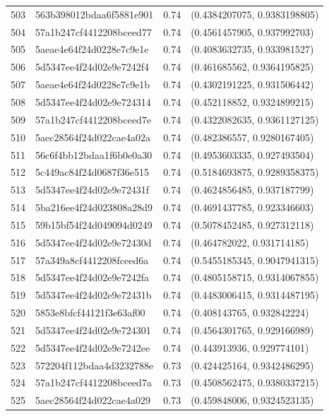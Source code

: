 \begin{table}[ht]
\begin{tabular}{rlrl}
  503 & 563b398012bdaa6f5881e901 & 0.74 & (0.4384207075, 0.9383198805) \\ 
  504 & 57a1b247cf4412208bceed77 & 0.74 & (0.4561457905, 0.937992703) \\ 
  505 & 5aeae4e64f24d0228e7c9e1e & 0.74 & (0.4083632735, 0.933981527) \\ 
  506 & 5d5347ee4f24d02e9e7242f4 & 0.74 & (0.461685562, 0.9364195825) \\ 
  507 & 5aeae4e64f24d0228e7c9e1b & 0.74 & (0.4302191225, 0.931506442) \\ 
  508 & 5d5347ee4f24d02e9e724314 & 0.74 & (0.452118852, 0.9324899215) \\ 
  509 & 57a1b247cf4412208bceed7e & 0.74 & (0.4322082635, 0.9361127125) \\ 
  510 & 5aec28564f24d022cae4a02a & 0.74 & (0.482386557, 0.9280167405) \\ 
  511 & 56c6f4bb12bdaa1f6b0e0a30 & 0.74 & (0.4953603335, 0.927493504) \\ 
  512 & 5c449ac84f24d0687f36e515 & 0.74 & (0.5184693875, 0.9289358375) \\ 
  513 & 5d5347ee4f24d02e9e72431f & 0.74 & (0.4624856485, 0.937187799) \\ 
  514 & 5ba216ee4f24d023808a28d9 & 0.74 & (0.4691437785, 0.923346603) \\ 
  515 & 59b15bf54f24d049094d0249 & 0.74 & (0.5078452485, 0.927312118) \\ 
  516 & 5d5347ee4f24d02e9e72430d & 0.74 & (0.464782022, 0.931714185) \\ 
  517 & 57a349a8cf4412208fceed6a & 0.74 & (0.5455185345, 0.9047941315) \\ 
  518 & 5d5347ee4f24d02e9e7242fa & 0.74 & (0.4805158715, 0.9314067855) \\ 
  519 & 5d5347ee4f24d02e9e72431b & 0.74 & (0.4483006415, 0.9314487195) \\ 
  520 & 5853e8bfcf44121f3e63af00 & 0.74 & (0.408143765, 0.932842224) \\ 
  521 & 5d5347ee4f24d02e9e724301 & 0.74 & (0.4564301765, 0.929166989) \\ 
  522 & 5d5347ee4f24d02e9e7242ee & 0.74 & (0.443913936, 0.929774101) \\ 
  523 & 572204f112bdaa4d3232788e & 0.73 & (0.424425164, 0.9342486295) \\ 
  524 & 57a1b247cf4412208bceed7a & 0.73 & (0.4508562475, 0.9380337215) \\ 
  525 & 5aec28564f24d022cae4a029 & 0.73 & (0.459848006, 0.9324523135) \\ 

\end{tabular}
\end{table}

